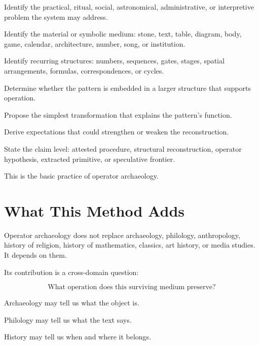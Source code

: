 \documentclass[11pt]{book}
\begin{document}
\begin{description}[leftmargin=3.5cm, style=nextline]
    \item[1. Solved Problem]
    Identify the practical, ritual, social, astronomical, administrative, or interpretive problem the system may address.

    \item[2. Medium]
    Identify the material or symbolic medium: stone, text, table, diagram, body, game, calendar, architecture, number, song, or institution.

    \item[3. Pattern]
    Identify recurring structures: numbers, sequences, gates, stages, spatial arrangements, formulas, correspondences, or cycles.

    \item[4. Scaffold]
    Determine whether the pattern is embedded in a larger structure that supports operation.

    \item[5. Minimal Operator]
    Propose the simplest transformation that explains the pattern's function.

    \item[6. Test]
    Derive expectations that could strengthen or weaken the reconstruction.

    \item[7. Boundary]
    State the claim level: attested procedure, structural reconstruction, operator hypothesis, extracted primitive, or speculative frontier.
\end{description}

This is the basic practice of operator archaeology.

\section{What This Method Adds}

Operator archaeology does not replace archaeology, philology, anthropology, history of religion, history of mathematics, classics, art history, or media studies. It depends on them.

Its contribution is a cross-domain question:

\[
\text{What operation does this surviving medium preserve?}
\]

Archaeology may tell us what the object is.

Philology may tell us what the text says.

History may tell us when and where it belongs.
\end{document}
